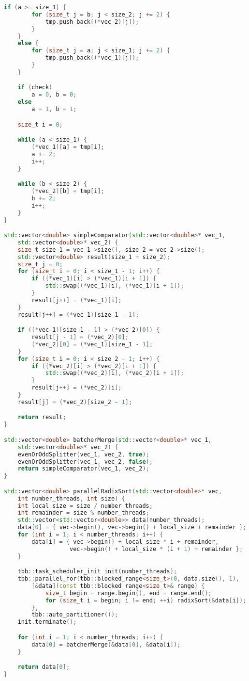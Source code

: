 \documentclass{report}
\begin{document}
\begin{lstlisting}[language=C++]
	if (a >= size_1) {
		for (size_t j = b; j < size_2; j += 2) {
			tmp.push_back((*vec_2)[j]);
		}
	}
	else {
		for (size_t j = a; j < size_1; j += 2) {
			tmp.push_back((*vec_1)[j]);
		}
	}

	if (check)
		a = 0, b = 0;
	else
		a = 1, b = 1;

	size_t i = 0;

	while (a < size_1) {
		(*vec_1)[a] = tmp[i];
		a += 2;
		i++;
	}

	while (b < size_2) {
		(*vec_2)[b] = tmp[i];
		b += 2;
		i++;
	}
}

std::vector<double> simpleComparator(std::vector<double>* vec_1,
	std::vector<double>* vec_2) {
	size_t size_1 = vec_1->size(), size_2 = vec_2->size();
	std::vector<double> result(size_1 + size_2);
	size_t j = 0;
	for (size_t i = 0; i < size_1 - 1; i++) {
		if ((*vec_1)[i] > (*vec_1)[i + 1]) {
			std::swap((*vec_1)[i], (*vec_1)[i + 1]);
		}
		result[j++] = (*vec_1)[i];
	}
	result[j++] = (*vec_1)[size_1 - 1];

	if ((*vec_1)[size_1 - 1] > (*vec_2)[0]) {
		result[j - 1] = (*vec_2)[0];
		(*vec_2)[0] = (*vec_1)[size_1 - 1];
	}
	for (size_t i = 0; i < size_2 - 1; i++) {
		if ((*vec_2)[i] > (*vec_2)[i + 1]) {
			std::swap((*vec_2)[i], (*vec_2)[i + 1]);
		}
		result[j++] = (*vec_2)[i];
	}
	result[j] = (*vec_2)[size_2 - 1];

	return result;
}

std::vector<double> batcherMerge(std::vector<double>* vec_1,
	std::vector<double>* vec_2) {
	evenOrOddSplitter(vec_1, vec_2, true);
	evenOrOddSplitter(vec_1, vec_2, false);
	return simpleComparator(vec_1, vec_2);
}

std::vector<double> parallelRadixSort(std::vector<double>* vec,
	int number_threads, int size) {
	int local_size = size / number_threads;
	int remainder = size % number_threads;
	std::vector<std::vector<double>> data(number_threads);
	data[0] = { vec->begin(), vec->begin() + local_size + remainder };
	for (int i = 1; i < number_threads; i++) {
		data[i] = { vec->begin() + local_size * i + remainder,
				   vec->begin() + local_size * (i + 1) + remainder };
	}

	tbb::task_scheduler_init init(number_threads);
	tbb::parallel_for(tbb::blocked_range<size_t>(0, data.size(), 1),
		[&data](const tbb::blocked_range<size_t>& range) {
			size_t begin = range.begin(), end = range.end();
			for (size_t i = begin; i != end; ++i) radixSort(&data[i]);
		},
		tbb::auto_partitioner());
	init.terminate();

	for (int i = 1; i < number_threads; i++) {
		data[0] = batcherMerge(&data[0], &data[i]);
	}

	return data[0];
}
\end{lstlisting}
\end{document}

